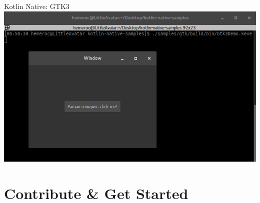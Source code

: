 \begin{frame}[fragile]{Kotlin Native: GTK3}
	\includegraphics[width=0.85\paperwidth]{figures/gtk3}
\end{frame}

\section{Contribute \& Get Started}

